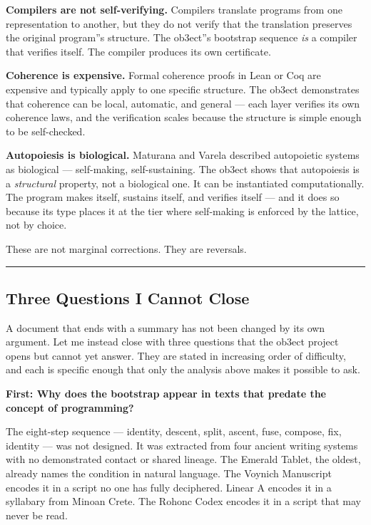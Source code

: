 \documentclass[12pt,a4paper]{article}
\begin{document}
\textbf{Compilers are not self-verifying.} Compilers translate programs from one representation to another, but they do not verify that the translation preserves the original program''s structure. The ob3ect''s bootstrap sequence \emph{is} a compiler that verifies itself. The compiler produces its own certificate.

\textbf{Coherence is expensive.} Formal coherence proofs in Lean or Coq are expensive and typically apply to one specific structure. The ob3ect demonstrates that coherence can be local, automatic, and general --- each layer verifies its own coherence laws, and the verification scales because the structure is simple enough to be self-checked.

\textbf{Autopoiesis is biological.} Maturana and Varela described autopoietic systems as biological --- self-making, self-sustaining. The ob3ect shows that autopoiesis is a \emph{structural} property, not a biological one. It can be instantiated computationally. The program makes itself, sustains itself, and verifies itself --- and it does so because its type places it at the tier where self-making is enforced by the lattice, not by choice.

These are not marginal corrections. They are reversals.

\begin{center}
\rule{0.5\textwidth}{0.4pt}
\end{center}

\subsection{Three Questions I Cannot Close}

A document that ends with a summary has not been changed by its own argument. Let me instead close with three questions that the ob3ect project opens but cannot yet answer. They are stated in increasing order of difficulty, and each is specific enough that only the analysis above makes it possible to ask.

\textbf{First: Why does the bootstrap appear in texts that predate the concept of programming?}

The eight-step sequence --- identity, descent, split, ascent, fuse, compose, fix, identity --- was not designed. It was extracted from four ancient writing systems with no demonstrated contact or shared lineage. The Emerald Tablet, the oldest, already names the condition in natural language. The Voynich Manuscript encodes it in a script no one has fully deciphered. Linear A encodes it in a syllabary from Minoan Crete. The Rohonc Codex encodes it in a script that may never be read.
\end{document}
